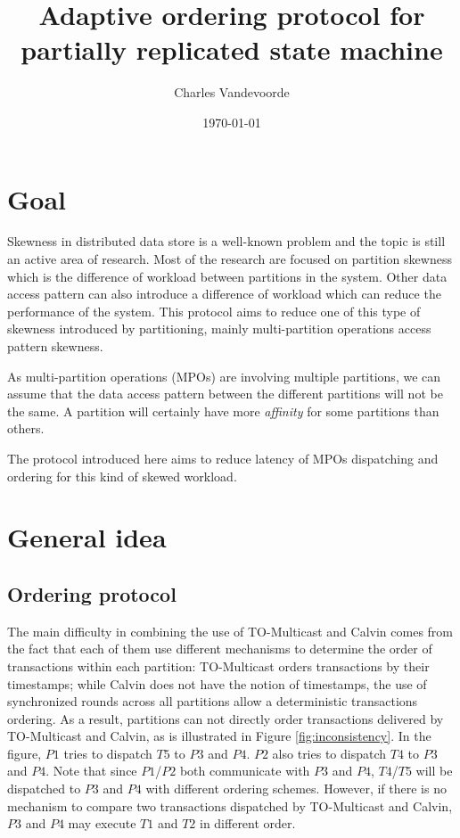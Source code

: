 \documentclass[a4paper, 10pt]{article}
\title{Adaptive ordering protocol for partially replicated state machine}
\author{Charles Vandevoorde}
\date{\today}
\newcommand{\GE}{TO-Multicast}
\newcommand{\PE}{Calvin}
\begin{document}
\maketitle

\section{Goal}

Skewness in distributed data store is a well-known problem and the topic is still an active area of research.
Most of the research are focused on partition skewness which is the difference of workload between
partitions in the system. Other data access pattern can also introduce a difference of workload which can
reduce the performance of the system. This protocol aims to reduce one of this type of skewness introduced by
partitioning, mainly multi-partition operations access pattern skewness.

As multi-partition operations (MPOs) are involving multiple partitions, we can assume that the data access pattern
between the different partitions will not be the same. A partition will certainly have more \textit{affinity}
for some partitions than others.

The protocol introduced here aims to reduce latency of MPOs dispatching and ordering for this kind of skewed workload.

\section{General idea} \label{sec:challenges}

   \subsection{Ordering protocol}

   The main difficulty in combining the use of {\GE} and {\PE} comes from the fact that each of them
   use different mechanisms to determine the order of transactions within each partition: {\GE}
   orders transactions by their timestamps; while {\PE} does not have the notion of timestamps, the
   use of synchronized rounds across all partitions allow a deterministic transactions ordering.
   As a result, partitions can not directly order transactions delivered by {\GE} and {\PE}, as is illustrated in Figure
   \ref{fig:inconsistency}. In the figure, $P1$ tries to dispatch $T5$ to $P3$ and $P4$. $P2$ also tries to
   dispatch $T4$ to $P3$ and $P4$. Note that since $P1$/$P2$ both communicate with $P3$ and $P4$,
   $T4$/$T5$ will be dispatched to $P3$ and $P4$ with different ordering schemes.
   However, if there is
   no mechanism to compare two transactions dispatched by {\GE} and {\PE}, $P3$ and $P4$ may execute
   $T1$ and $T2$ in different order. \\
\end{document}
